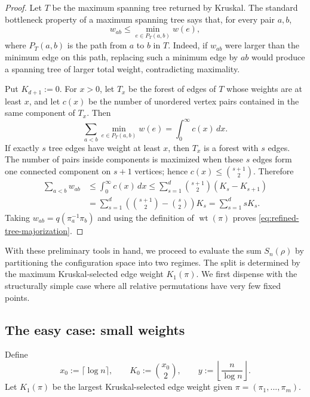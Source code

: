 \documentclass[11pt,reqno]{amsart}
\theoremstyle{definition}
\theoremstyle{remark}
\renewcommand\le{\leqslant}
\newcommand{\wt}{\operatorname{wt}}
\begin{document}
\begin{proof}
Let $T$ be the maximum spanning tree returned by Kruskal. The standard bottleneck property of a maximum spanning tree says that, for every pair $a,b$,
\[
        w_{ab}\le \min_{e\in P_T(a,b)}w(e),
\]
where $P_T(a,b)$ is the path from $a$ to $b$ in $T$. Indeed, if $w_{ab}$ were larger than the minimum edge on this path, replacing such a minimum edge by $ab$ would produce a spanning tree of larger total weight, contradicting maximality.

Put $K_{d+1}:=0$. For $x>0$, let $T_x$ be the forest of edges of $T$ whose weights are at least $x$, and let $c(x)$ be the number of unordered vertex pairs contained in the same component of $T_x$. Then
\[
        \sum_{a<b}\min_{e\in P_T(a,b)}w(e)=\int_0^\infty c(x)\,dx .
\]
If exactly $s$ tree edges have weight at least $x$, then $T_x$ is a forest with $s$ edges. The number of pairs inside components is maximized when these $s$ edges form one connected component on $s+1$ vertices; hence $c(x)\le \binom{s+1}{2}$. Therefore
\begin{align*}
        \sum_{a<b}w_{ab}
        &\le \int_0^\infty c(x)\,dx
         \le \sum_{s=1}^d \binom{s+1}{2}(K_s-K_{s+1})        \\
        &=\sum_{s=1}^d
          \left(\binom{s+1}{2}-\binom{s}{2}\right)K_s
          =\sum_{s=1}^d sK_s .
\end{align*}
Taking $w_{ab}=q(\pi_a^{-1}\pi_b)$ and using the definition of $\wt(\pi)$ proves \eqref{eq:refined-tree-majorization}.
\end{proof}

With these preliminary tools in hand, we proceed to evaluate the sum \(S_n(\rho)\) by partitioning the configuration space into two regimes. The split is determined by the maximum Kruskal-selected edge weight \(K_1(\pi)\). We first dispense with the structurally simple case where all relative permutations have very few fixed points.

\medskip

\subsection{The easy case: small weights}\label{subsec:easy_regime}

Define
\[
        x_0:=\lceil\log n\rceil,
        \qquad K_0:=\binom{x_0}2,
        \qquad
        y:=\left\lfloor\frac n{\log n}\right\rfloor .
\]
Let $K_1(\pi)$ be the largest Kruskal-selected edge weight given $\pi=(\pi_1,...,\pi_m)$.
\end{document}
